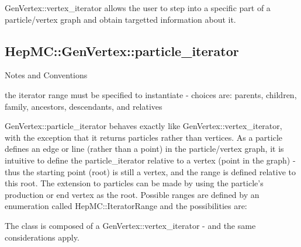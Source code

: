 \documentclass[11pt,letterpaper]{article}
\begin{document}
GenVertex::vertex\_iterator allows the user to step into a specific part
of a particle/vertex graph and obtain targetted information about it. 

%
%

\subsection{HepMC::GenVertex::particle\_iterator}
\begin{myitemize}{Notes and Conventions}
  \item the iterator range must be specified to instantiate -
    choices are: parents, children, family, ancestors, descendants,
    and relatives 
\end{myitemize}

GenVertex::particle\_iterator behaves exactly like
GenVertex::vertex\_iterator, with the exception that it returns particles
rather than vertices.  As a particle defines an edge or line (rather
than a point) in the particle/vertex graph, it is intuitive to define
the particle\_iterator relative to a vertex (point in the graph) - thus
the starting point (root) is still a vertex, and the range is defined
relative to this root.  The extension to particles can be made by
using the particle's production or end vertex as the root.  Possible
ranges are defined by an enumeration called HepMC::IteratorRange and
the possibilities are:
\begin{itemize}\setlength{\itemsep}{0pt}
\end{itemize}

The class is composed of a GenVertex::vertex\_iterator - 
and the same considerations apply.

%
%
\end{document}

